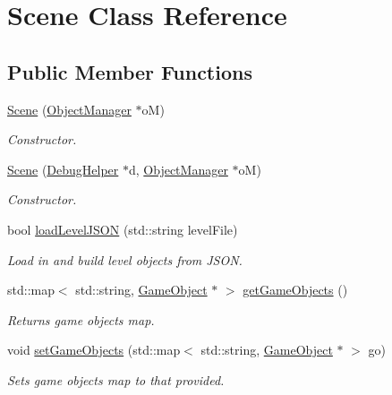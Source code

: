 \hypertarget{class_scene}{}\section{Scene Class Reference}
\label{class_scene}
\subsection*{Public Member Functions}
\begin{DoxyCompactItemize}
\item 
\mbox{\label{class_scene_a196045cf0bd3b0b915c627744e413a0b}} 
\mbox{\hyperlink{class_scene_a196045cf0bd3b0b915c627744e413a0b}{Scene}} (\mbox{\hyperlink{class_object_manager}{Object\+Manager}} $\ast$oM)
\begin{DoxyCompactList}\small\item\em Constructor. \end{DoxyCompactList}\item 
\mbox{\label{class_scene_adad88c7667e5d67bb28c4ec4bf3a22dc}} 
\mbox{\hyperlink{class_scene_adad88c7667e5d67bb28c4ec4bf3a22dc}{Scene}} (\mbox{\hyperlink{class_debug_helper}{Debug\+Helper}} $\ast$d, \mbox{\hyperlink{class_object_manager}{Object\+Manager}} $\ast$oM)
\begin{DoxyCompactList}\small\item\em Constructor. \end{DoxyCompactList}\item 
\mbox{\label{class_scene_ad524a6e4cec067e9b1a59be767453cdd}} 
bool \mbox{\hyperlink{class_scene_ad524a6e4cec067e9b1a59be767453cdd}{load\+Level\+J\+S\+ON}} (std\+::string level\+File)
\begin{DoxyCompactList}\small\item\em Load in and build level objects from J\+S\+ON. \end{DoxyCompactList}\item 
\mbox{\label{class_scene_aa5d4a784fe62d15fb083f8b73c3b4f94}} 
std\+::map$<$ std\+::string, \mbox{\hyperlink{class_game_object}{Game\+Object}} $\ast$ $>$ \mbox{\hyperlink{class_scene_aa5d4a784fe62d15fb083f8b73c3b4f94}{get\+Game\+Objects}} ()
\begin{DoxyCompactList}\small\item\em Returns game objects map. \end{DoxyCompactList}\item 
\mbox{\label{class_scene_a9a1bad34e21edf3eda7fe8183c034b9c}} 
void \mbox{\hyperlink{class_scene_a9a1bad34e21edf3eda7fe8183c034b9c}{set\+Game\+Objects}} (std\+::map$<$ std\+::string, \mbox{\hyperlink{class_game_object}{Game\+Object}} $\ast$ $>$ go)
\begin{DoxyCompactList}\small\item\em Sets game objects map to that provided. \end{DoxyCompactList}\end{DoxyCompactItemize}
